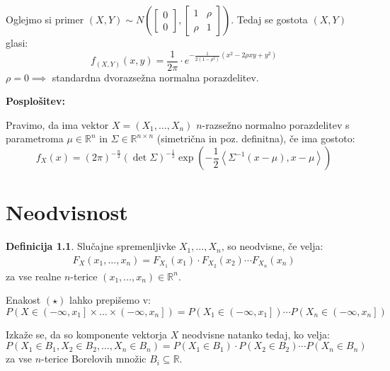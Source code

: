 \documentclass[12pt]{book}
\def\n{\noindent}
\theoremstyle{definition}
\newtheorem{definicija}{Definicija}
\theoremstyle{plain}
\theoremstyle{plain}
\theoremstyle{plain}
\theoremstyle{remark}
\begin{document}
\begin{zgled}
    Oglejmo si primer $(X,Y) \sim N\left(\begin{bmatrix} 0 \\ 0 \end{bmatrix},\begin{bmatrix} 1 & \rho \\ \rho & 1 \end{bmatrix}\right)$. Tedaj se gostota $(X, Y)$ glasi:
    $$
    f_{(X, Y)}(x, y)=\frac{1}{2 \pi} \cdot e^{-\frac{1}{2\left(1-\rho^2\right)}\left(x^2-2 \rho x y+y^2\right)}
    $$
    $\rho = 0 \implies$ standardna dvorazsežna normalna porazdelitev.
\end{zgled}

\n \textbf{Posplošitev:}

\n Pravimo, da ima vektor $X=\left(X_1, \ldots, X_n\right)$ $n$-razsežno normalno porazdelitev s parametroma $\mu \in \mathbb{R}^n$ in $\Sigma \in \mathbb{R}^{n \times n}$ (simetrična in poz. definitna), če ima gostoto: 
$$
f_{X}(x)=(2 \pi)^{-\frac{n}{2}}(\det \Sigma)^{-\frac{1}{2}} \exp\left(-\frac{1}{2}\left\langle\Sigma^{-1}(x-\mu), x-\mu\right\rangle\right)
$$

\chapter{Neodvisnost}

\begin{definicija}
    Slučajne spremenljivke $X_1, \ldots, X_n$, so neodvisne, če velja: 
    \begin{align*}
        F_{X}\left(x_1, \ldots, x_n\right)=F_{X_1}\left(x_1\right) \cdot F_{X_2}\left(x_2\right) \cdots F_{X_n}\left(x_n\right) \tag{$\star$} 
    \end{align*}
    za vse realne $n$-terice $\left(x_1, \ldots, x_n\right) \in \mathbb{R}^n$.
\end{definicija}

\n Enakost $(\star)$ lahko prepišemo v: 
$$
P\left(X \in\left(-\infty, x_1\right] \times \ldots \times\left(-\infty, x_n\right]\right)=P\left(X_1 \in\left(-\infty, x_1\right]\right) \cdots  P\left(X_n \in\left(-\infty, x_n\right]\right)
$$

\n Izkaže se, da so komponente vektorja $X$ neodvisne natanko tedaj, ko velja:
$$
P\left(X_1 \in B_1, X_2 \in B_2, \ldots, X_n \in B_n\right)=P\left(X_1 \in B_1\right) \cdot P\left(X_2 \in B_2\right) \cdots P\left(X_n \in B_n\right)
$$
za vse $n$-terice Borelovih množic $B_i \subseteq \mathbb{R}$.
\end{document}
